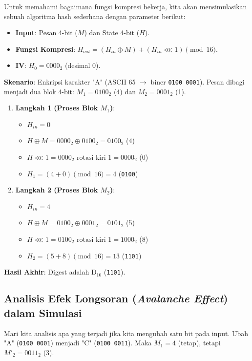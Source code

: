Untuk memahami bagaimana fungsi kompresi bekerja, kita akan mensimulasikan sebuah algoritma hash sederhana dengan parameter berikut:
\begin{itemize}
    \item \textbf{Input}: Pesan 4-bit ($M$) dan State 4-bit ($H$).
    \item \textbf{Fungsi Kompresi}: $H_{out} = (H_{in} \oplus M) + (H_{in} \lll 1) \pmod{16}$.
    \item \textbf{IV}: $H_0 = 0000_2$ (desimal 0).
\end{itemize}

\textbf{Skenario}: Enkripsi karakter "A" (ASCII 65 $\rightarrow$ biner \texttt{0100 0001}).
Pesan dibagi menjadi dua blok 4-bit: $M_1 = 0100_2$ (4) dan $M_2 = 0001_2$ (1).

\begin{enumerate}
    \item \textbf{Langkah 1 (Proses Blok $M_1$)}:
    \begin{itemize}
        \item $H_{in} = 0$
        \item $H \oplus M = 0000_2 \oplus 0100_2 = 0100_2$ (4)
        \item $H \lll 1 = 0000_2 \text{ rotasi kiri 1} = 0000_2$ (0)
        \item $H_1 = (4 + 0) \pmod{16} = 4$ (\texttt{0100})
    \end{itemize}

    \item \textbf{Langkah 2 (Proses Blok $M_2$)}:
    \begin{itemize}
        \item $H_{in} = 4$
        \item $H \oplus M = 0100_2 \oplus 0001_2 = 0101_2$ (5)
        \item $H \lll 1 = 0100_2 \text{ rotasi kiri 1} = 1000_2$ (8)
        \item $H_2 = (5 + 8) \pmod{16} = 13$ (\texttt{1101})
    \end{itemize}
\end{enumerate}
\textbf{Hasil Akhir}: Digest adalah $\text{D}_{16}$ (\texttt{1101}).

\subsection{Analisis Efek Longsoran (\textit{Avalanche Effect}) dalam Simulasi}

Mari kita analisis apa yang terjadi jika kita mengubah satu bit pada input. Ubah "A" (\texttt{0100 0001}) menjadi "C" (\texttt{0100 0011}). Maka $M_1 = 4$ (tetap), tetapi $M'_2 = 0011_2$ (3).

